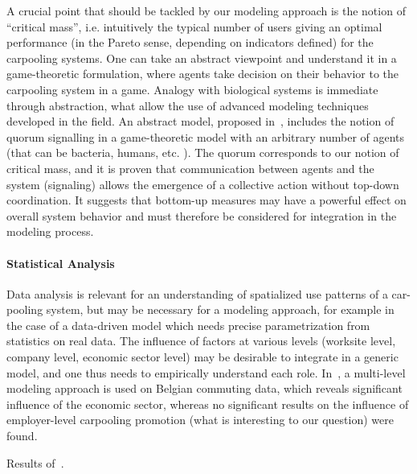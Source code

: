 A crucial point that should be tackled by our modeling approach is the notion of ``critical mass'', i.e. intuitively the typical number of users giving an optimal performance (in the Pareto sense, depending on indicators defined) for the carpooling systems. One can take an abstract viewpoint and understand it in a game-theoretic formulation, where agents take decision on their behavior to the carpooling system in a game. Analogy with biological systems is immediate through abstraction, what allow the use of advanced modeling techniques developed in the field. An abstract model, proposed in~\cite{10.1371/journal.pcbi.1004101}, includes the notion of quorum signalling in a game-theoretic model with an arbitrary number of agents (that can be bacteria, humans, etc. ). The quorum corresponds to our notion of critical mass, and it is proven that communication between agents and the system (signaling) allows the emergence of a collective action without top-down coordination. It suggests that bottom-up measures may have a powerful effect on overall system behavior and must therefore be considered for integration in the modeling process.




\paragraph{Statistical Analysis}

Data analysis is relevant for an understanding of spatialized use patterns of a car-pooling system, but may be necessary for a modeling approach, for example in the case of a data-driven model which needs precise parametrization from statistics on real data. The influence of factors at various levels (worksite level, company level, economic sector level) may be desirable to integrate in a generic model, and one thus needs to empirically understand each role. In~\cite{vanoutrive2009carpooling}, a multi-level modeling approach is used on Belgian commuting data, which reveals significant influence of the economic sector, whereas no significant results on the influence of employer-level carpooling promotion (what is interesting to our question) were found.


Results of~\cite{Abrahamse201245}.

















